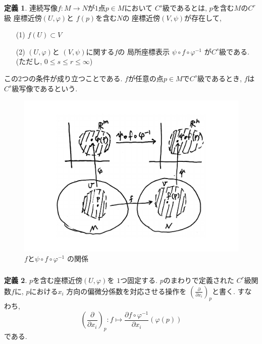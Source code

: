 \documentclass[dvipdfmx,cjk]{beamer}
\theoremstyle{definition}
\newtheorem{dfn}{\textbf{ 定義 }}
\begin{document}
\begin{frame}
  \begin{dfn}\label{def:C^s map}
    連続写像$f:M\to N$が$1$点$p\in M$において
    $C^s$級であるとは, $p$を含む$M$の$C^r$級
    座標近傍$(U,\varphi)$と
    $f(p)$を含む$N$の
    座標近傍$(V,\psi)$が存在して, 
    \begin{itemize}
        \item[(1)]$f(U)\subset V$
        \item[(2)]$(U,\varphi)$と
        $(V,\psi)$に関する$f$の
        局所座標表示
        $\psi\circ f\circ \varphi^{-1}$
        が$C^s$級である.
        (ただし, $0\leq s \leq r \leq \infty$) 
    \end{itemize}
    この$2$つの条件が成り立つことである. 
    $f$が任意の点$p\in M$で$C^s$級であるとき, 
    $f$は$C^s$級写像であるという. 
  \end{dfn}
  \begin{figure}[H]
    \centering
    \includegraphics[keepaspectratio, scale=0.2]
         {Csmap.pdf}
    \caption{$f$と$\psi\circ f\circ \varphi^{-1}$
    の関係}
    \label{Csmap}
  \end{figure}
\end{frame}

\begin{frame}
  \frametitle{}
  \begin{dfn}
    $p$を含む座標近傍$(U,\varphi)$を
    $1$つ固定する. $p$のまわりで定義された
    $C^r$級関数$f$に, $p$における$x_i$
    方向の偏微分係数を対応させる操作を
    $\left(\frac{\partial}{\partial x_i}
    \right)_p$と書く. すなわち, 
    $$\left(\frac{\partial}{\partial x_i}
    \right)_p:f\mapsto 
    \frac{\partial f\circ \varphi^{-1}}{\partial x_i}(
      \varphi(p))$$
    である. 
  \end{dfn}
\end{frame}
\end{document}

